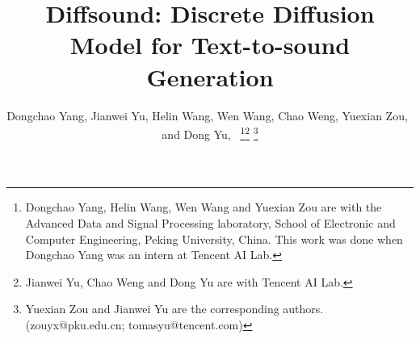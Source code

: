 \documentclass[lettersize,journal]{IEEEtran}
\begin{document}
\title{Diffsound: Discrete Diffusion Model for Text-to-sound Generation}
\author{Dongchao Yang, Jianwei Yu, Helin Wang, Wen Wang, Chao Weng, Yuexian Zou,~ and Dong Yu,~
\thanks{Dongchao Yang, Helin Wang, Wen Wang and Yuexian Zou are with the Advanced Data and Signal Processing laboratory, School of Electronic and Computer Engineering, Peking University, China. This work was done when Dongchao Yang was an intern at Tencent AI Lab.}\thanks{Jianwei Yu, Chao Weng and Dong Yu are with Tencent AI Lab.}
\thanks{Yuexian Zou and Jianwei Yu are the corresponding authors.\\ 
(zouyx@pku.edu.cn; tomasyu@tencent.com)}}

\end{document}
